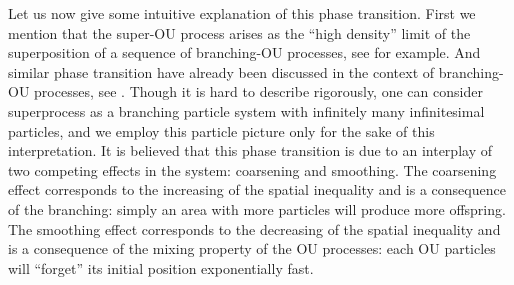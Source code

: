 \documentclass[12pt,a4paper]{amsart}
\theoremstyle{plain}
\theoremstyle{definition}
\numberwithin{equation}{section}
\begin{document}
Let us now give some intuitive explanation of this phase transition. 
First we mention that the super-OU process arises as the ``high density'' limit of the superposition of a sequence of branching-OU processes, see \cite{Li2011Measure-valued} for example.
And similar phase transition have already been discussed in the context of branching-OU processes, see \cite{MarksMilos2018CLT}. 
Though it is hard to describe rigorously, one can consider superprocess as a branching particle system with infinitely many infinitesimal particles, and we employ this particle picture only for the sake of this interpretation. 
It is believed that this phase transition is due to an interplay of two competing effects in the system: coarsening and smoothing. 
The coarsening effect corresponds to the increasing of the spatial inequality and is a consequence of the branching: simply an area with more particles will produce more offspring.
The smoothing effect corresponds to the decreasing of the spatial inequality and is a consequence of the mixing property of the OU processes: each OU particles will ``forget'' its initial position exponentially fast.
\end{document}
